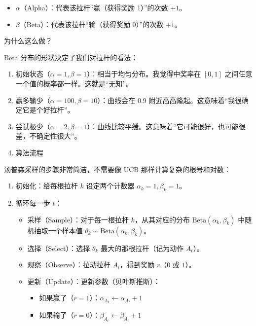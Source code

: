 \begin{itemize}
\tightlist
\item
  \(\alpha\)（Alpha）：代表该拉杆``赢（获得奖励 1）''的次数 \(+1\)。
\item
  \(\beta\)（Beta）：代表该拉杆``输（获得奖励 0）''的次数 \(+1\)。
\end{itemize}

为什么这么做？

Beta 分布的形状决定了我们对拉杆的看法：

\begin{enumerate}
\def\labelenumi{\arabic{enumi}.}
\item
  初始状态（\(\alpha=1,\beta=1\)）：相当于均匀分布。我觉得中奖率在 \([0,1]\) 之间任意一个值的概率都一样。这就是``无知''。
\item
  赢多输少（\(\alpha=100,\beta=10\)）：曲线会在 \(0.9\) 附近高高隆起。这意味着``我很确定它是个好拉杆''。
\item
  尝试极少（\(\alpha=2,\beta=1\)）：曲线比较平缓。这意味着``它可能很好，也可能很差，不确定性很大''。
\item
  算法流程
\end{enumerate}

汤普森采样的步骤非常简洁，不需要像 UCB 那样计算复杂的根号和对数：

\begin{enumerate}
\def\labelenumi{\arabic{enumi}.}
\tightlist
\item
  初始化：给每根拉杆 \(k\) 设定两个计数器 \(\alpha_k=1,\beta_k=1\)。
\item
  循环每一步 \(t\)：

  \begin{itemize}
  \item
    采样（Sample）：对于每一根拉杆 \(k\)，从其对应的分布 \(\mathrm{Beta}(\alpha_k,\beta_k)\) 中随机抽取一个样本值 \(\theta_k\sim \mathrm{Beta}(\alpha_k,\beta_k)\)。
  \item
    选择（Select）：选择 \(\theta_k\) 最大的那根拉杆（记为动作 \(A_t\)）。
  \item
    观察（Observe）：拉动拉杆 \(A_t\)，得到奖励 \(r\)（\(0\) 或 \(1\)）。
  \item
    更新（Update）：更新参数（贝叶斯推断）：

    \begin{itemize}
    \tightlist
    \item
      如果赢了（\(r=1\)）：\(\alpha_{A_t}\leftarrow \alpha_{A_t}+1\)
    \item
      如果输了（\(r=0\)）：\(\beta_{A_t}\leftarrow \beta_{A_t}+1\)
    \end{itemize}
  \end{itemize}
\end{enumerate}

